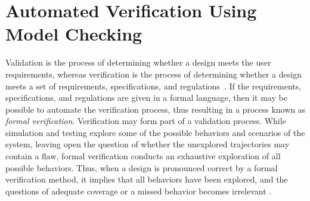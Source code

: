 \documentclass[journal]{IEEEtran}
\begin{document}
\section{Automated Verification Using Model Checking}
\label{sec:AutomatedVerification}
Validation is the process of determining whether a design meets the user requirements, whereas verification is the process of determining whether a design meets a set of requirements, specifications, and regulations~\cite{ClarkeHV18}. If the requirements, specifications, and regulations are given in a formal language, then it may be possible to automate the verification process, thus resulting in a process known as \textit{formal verification}. Verification may form part of a validation process.
While simulation and testing explore some of the possible behaviors and scenarios of the system, leaving open the question of whether the unexplored trajectories may contain a flaw, formal verification conducts an exhaustive exploration of all possible behaviors. Thus, when a design is pronounced correct by a formal verification method, it implies that all behaviors have been explored, and the questions of adequate coverage or a missed behavior becomes irrelevant \cite{Clarke2012}.
\end{document}
